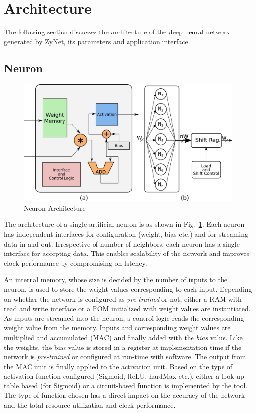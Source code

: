 \section{Architecture}
\label{sec_architecture}

The following section discusses the architecture of the deep neural network generated by ZyNet, its parameters and application interface.
\subsection{Neuron}
\begin{figure}[!t]
\centering
   \includegraphics[width=\columnwidth]{Figures/neuron.pdf}
   \caption{Neuron Architecture}
   \label{fig:neuron}
   \vspace{-3mm}
\end{figure}
The architecture of a single artificial neuron is as shown in Fig.~\ref{fig:neuron}.
Each neuron has independent interfaces for configuration (weight, bias etc.) and for streaming data in and out.
Irrespective of number of neighbors, each neuron has a single interface for accepting data.
This enables scalability of the network and improves clock performance by compromising on latency. 

An internal memory, whose size is decided by the number of inputs to the neuron, is used to store the weight values corresponding to each input.
Depending on whether the network is configured as \emph{pre-trained} or not, either a RAM with read and write interface or a ROM initialized with weight values are instantiated.
As inputs are streamed into the neuron, a control logic reads the corresponding weight value from the memory.
Inputs and corresponding weight values are multiplied and accumulated (MAC) and finally added with the \emph{bias} value.
Like the weights, the bias value is stored in a register at implementation time if the network is \emph{pre-trained} or configured at run-time with software.
The output from the MAC unit is finally applied to the activation unit.
Based on the type of activation function configured (Sigmoid, ReLU, hardMax etc.), either a look-up-table based (for Sigmoid) or a circuit-based function is implemented by the tool.
The type of function chosen has a direct impact on the accuracy of the network and the total resource utilization and clock performance. 

